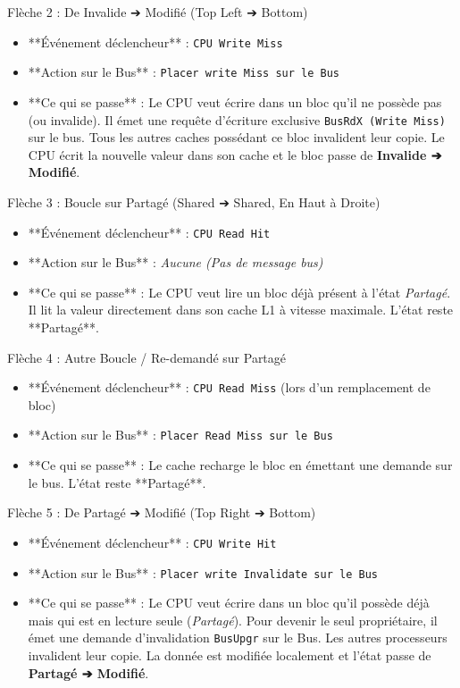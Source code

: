 \documentclass[12pt,a4paper]{article}
\begin{document}
\begin{transitionbox}{Flèche 2 : De Invalide ➔ Modifié (Top Left ➔ Bottom)}
\begin{itemize}
    \item **Événement déclencheur** : \texttt{CPU Write Miss}
    \item **Action sur le Bus** : \texttt{Placer write Miss sur le Bus}
    \item **Ce qui se passe** : Le CPU veut écrire dans un bloc qu'il ne possède pas (ou invalide). Il émet une requête d'écriture exclusive \texttt{BusRdX (Write Miss)} sur le bus. Tous les autres caches possédant ce bloc invalident leur copie. Le CPU écrit la nouvelle valeur dans son cache et le bloc passe de \textbf{Invalide ➔ Modifié}.
\end{itemize}
\end{transitionbox}

\begin{transitionbox}{Flèche 3 : Boucle sur Partagé (Shared ➔ Shared, En Haut à Droite)}
\begin{itemize}
    \item **Événement déclencheur** : \texttt{CPU Read Hit}
    \item **Action sur le Bus** : \textit{Aucune (Pas de message bus)}
    \item **Ce qui se passe** : Le CPU veut lire un bloc déjà présent à l'état \textit{Partagé}. Il lit la valeur directement dans son cache L1 à vitesse maximale. L'état reste **Partagé**.
\end{itemize}
\end{transitionbox}

\begin{transitionbox}{Flèche 4 : Autre Boucle / Re-demandé sur Partagé}
\begin{itemize}
    \item **Événement déclencheur** : \texttt{CPU Read Miss} (lors d'un remplacement de bloc)
    \item **Action sur le Bus** : \texttt{Placer Read Miss sur le Bus}
    \item **Ce qui se passe** : Le cache recharge le bloc en émettant une demande sur le bus. L'état reste **Partagé**.
\end{itemize}
\end{transitionbox}

\begin{transitionbox}{Flèche 5 : De Partagé ➔ Modifié (Top Right ➔ Bottom)}
\begin{itemize}
    \item **Événement déclencheur** : \texttt{CPU Write Hit}
    \item **Action sur le Bus** : \texttt{Placer write Invalidate sur le Bus}
    \item **Ce qui se passe** : Le CPU veut écrire dans un bloc qu'il possède déjà mais qui est en lecture seule (\textit{Partagé}). Pour devenir le seul propriétaire, il émet une demande d'invalidation \texttt{BusUpgr} sur le Bus. Les autres processeurs invalident leur copie. La donnée est modifiée localement et l'état passe de \textbf{Partagé ➔ Modifié}.
\end{itemize}
\end{transitionbox}
\end{document}
